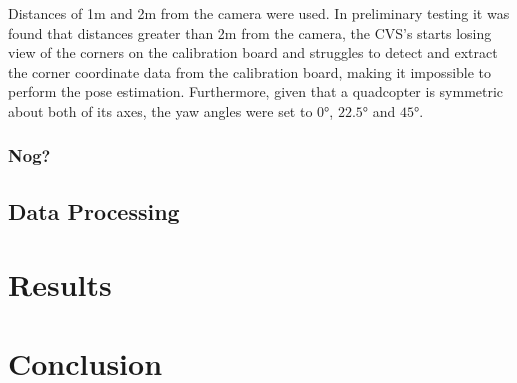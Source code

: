 Distances of 1m and 2m from the camera were used. In preliminary testing it was found that distances greater than 2m from the camera, the CVS's starts losing view of the corners on the calibration board and struggles to detect and extract the corner coordinate data from the calibration board, making it impossible to perform the pose estimation. Furthermore, given that a quadcopter is symmetric about both of its axes, the yaw angles were set to $\ang{0}$, $\ang{22.5}$ and $\ang{45}$. 

\subsubsection{Nog?}

\subsection{Data Processing}

\section{Results}

\section{Conclusion}


